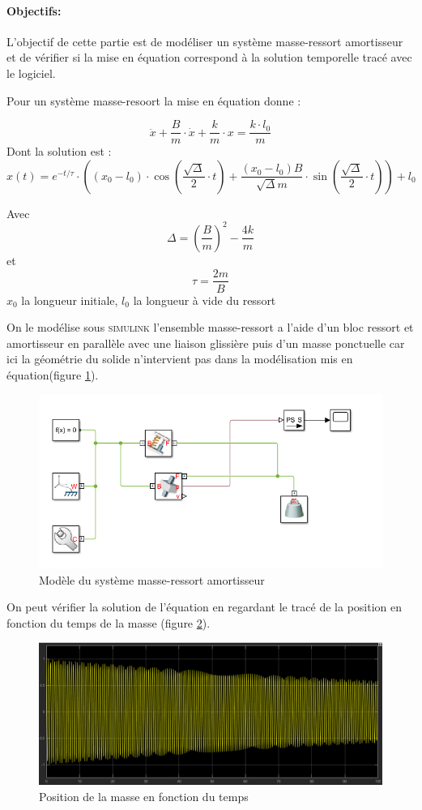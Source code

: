 \documentclass[12pt,a4paper]{article}
\begin{document}
\paragraph*{Objectifs:}
L'objectif de cette partie est de modéliser un système masse-ressort amortisseur et de vérifier si la mise en équation correspond à la solution temporelle tracé avec le logiciel.


Pour un système masse-resoort la mise en équation donne :

\[ \ddot{x}+\dfrac{B}{m} \cdot \dot{x} + \dfrac{k}{m} \cdot x = \dfrac{k \cdot l_{0}}{m} \]
Dont la solution est : 
\[ x(t) = e^{-t/\tau} \cdot \left((x_{0}-l_{0}) \cdot \cos(\dfrac{\sqrt{\Delta}}{2}\cdot t)+ \dfrac{(x_{0}-l_{0}) B}{\sqrt{\Delta} m} \cdot \sin(\dfrac{\sqrt{\Delta}}{2}\cdot t) \right) + l_{0} \]

Avec \[\Delta = (\dfrac{B}{m})^2 - \dfrac{4 k}{m}\] et \[\tau = \dfrac{2 m }{B}\]
$x_0$ la longueur initiale, $l_0$ la longueur à vide du ressort 
\newline

On le modélise sous \textsc{simulink} l'ensemble masse-ressort a l'aide d'un bloc ressort et amortisseur en parallèle avec une liaison glissière puis d'un masse ponctuelle car ici la géométrie du solide n'intervient pas dans la modélisation mis en équation(figure \ref{masse}).

\begin{figure}[h!]
\centering
\includegraphics[scale=0.6]{masse.png}
\caption{Modèle du système masse-ressort amortisseur}
\label{masse}
\end{figure}
\newpage
On peut vérifier la solution de l'équation en regardant le tracé de la position en fonction du temps de la masse (figure \ref{masse_ressort}).

\begin{figure}[h!]
\centering
\includegraphics[scale=0.6]{masse_resort.png}
\caption{Position de la masse en fonction du temps }
\label{masse_ressort}
\end{figure}
\end{document}
